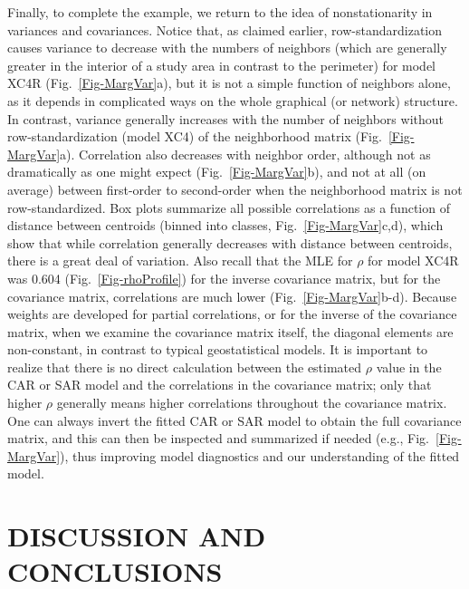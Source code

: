 \documentclass[11pt, titlepage]{article}\usepackage[]{graphicx}\usepackage[]{color}
\begin{document}
\begin{spacing}{1.9}
\begin{flushleft}
Finally, to complete the example, we return to the idea of nonstationarity in variances and covariances.  Notice that, as claimed earlier, row-standardization causes variance to decrease with the numbers of neighbors (which are generally greater in the interior of a study area in contrast to the perimeter) for model XC4R (Fig.~\ref{Fig-MargVar}a), but it is not a simple function of neighbors alone, as it depends in complicated ways on the whole graphical (or network) structure.  In contrast, variance generally increases with the number of neighbors without row-standardization (model XC4) of the neighborhood matrix (Fig.~\ref{Fig-MargVar}a). Correlation also decreases with neighbor order, although not as dramatically as one might expect (Fig.~\ref{Fig-MargVar}b), and not at all (on average) between first-order to second-order when the neighborhood matrix is not row-standardized. Box plots summarize all possible correlations as a function of distance between centroids (binned into classes, Fig.~\ref{Fig-MargVar}c,d), which show that while correlation generally decreases with distance between centroids, there is a great deal of variation. Also recall that the MLE for $\rho$ for model XC4R was 0.604 (Fig.~\ref{Fig-rhoProfile}) for the inverse covariance matrix, but for the covariance matrix, correlations are much lower (Fig.~\ref{Fig-MargVar}b-d). Because weights are developed for partial correlations, or for the inverse of the covariance matrix, when we examine the covariance matrix itself, the diagonal elements are non-constant, in contrast to typical geostatistical models. It is important to realize that there is no direct calculation between the estimated $\rho$ value in the CAR or SAR model and the correlations in the covariance matrix; only that higher $\rho$ generally means higher correlations throughout the covariance matrix. One can always invert the fitted CAR or SAR model to obtain the full covariance matrix, and this can then be inspected and summarized if needed (e.g., Fig.~\ref{Fig-MargVar}), thus improving model diagnostics and our understanding of the fitted model.

\section*{DISCUSSION AND CONCLUSIONS}


\end{flushleft}
\end{spacing}
\end{document}
